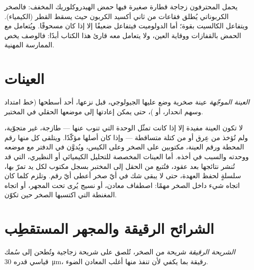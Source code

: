 يحمل المحترفون زجاجة قطارة صغيرة فيها حمض الهيدروكلوريك المخفف: فالصخر الكربوناتي يُطلق فقاعات من ثاني أكسيد الكربون حيث يسقط القطر (الكيمياء). ويتفاعل الكالسيت بقوة؛ أما الدولوميت فيتفاعل ضعيفًا إلا إذا كان مسحوقًا. ويُتعامل مع الحمض بالقفازات ووقاية العين، ولا يتعامل معه قارئ هذا الكتاب أبدًا: فالوصف يخص الممارسة المهنية.

\section{العينات}

\begin{definition}\label{def:b1:field-lab-methods-1:sample}
\emph{العينة الموجّهة} عينة صخرية وضع عليها الجيولوجي، قبل نزعها،  أحد أسطحها (خط امتداد وسهم انحدار، أو )، حتى يمكن إعادتها إلى موضعها الحقلي في المختبر.
\end{definition}

لا تكون العينة مفيدة إلا إذا كانت تمثّل الوحدة التي تنوب عنها --- طازجة، غير متجوّية، ولم تُؤخذ من عِرق أو من كتلة متساقطة --- وإذا كان أصلها مؤكّدًا. ويتلقى كل منها رقم المحطة ورقم العينة، مكتوبين على الصخر وعلى الكيس، ويُدوَّن في الدفتر مع موضعه ووحدته والسبب في أخذه. أما العينات المخصصة للتحليل الكيميائي أو النظيري، التي قد تُنشر نتائجها بعد عقود، فتُتبع من الحقل إلى المختبر بسجل مكتوب لكل يد تمرّ بها، سلسلةٍ لحفظ العهدة، حتى لا يبقى شك في أيّ صخر أعطى أيّ رقم. وتلزم  كلما كان اتجاه شيء داخل الصخر مهمًا: اصطفاف معادن، أو نسيج يُرى تحت المجهر، أو اتجاه المغنطة التي اكتسبها الصخر حين تكوّن.

\section{الشرائح الرقيقة والمجهر المستقطِب}

\begin{definition}\label{def:b1:field-lab-methods-1:thin-section}
\emph{الشريحة الرقيقة} شريحة من الصخر، تُلصق على شريحة زجاجية وتُطحن إلى سُمك قياسي قدره \qty{30}{\micro\metre}، رقيقة بما يكفي لأن تنفذ منها أغلب المعادن الضوء.
\end{definition}

